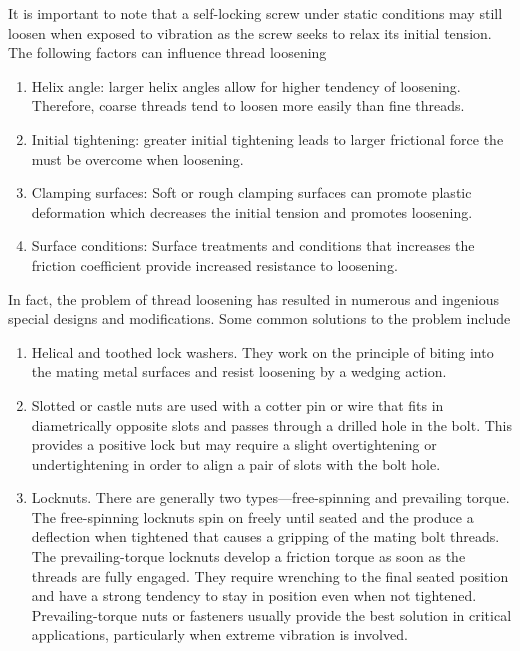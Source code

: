 \documentclass[a4paper,openany,nobib]{tufte-book}
\begin{document}
{{It is important to note that a self-locking screw under static
conditions may still loosen when exposed to vibration as the screw seeks
to relax its initial tension. The following factors can influence thread
loosening

\begin{enumerate}
\item Helix angle: larger helix angles allow for higher tendency of
loosening. Therefore, coarse threads tend to loosen more easily than
fine threads.

\item Initial tightening: greater initial tightening leads to larger
frictional force the must be overcome when loosening.

\item Clamping surfaces: Soft or rough clamping surfaces can promote
plastic deformation which decreases the initial tension and promotes
loosening.

\item Surface conditions: Surface treatments and conditions that increases
the friction coefficient provide increased resistance to loosening.
\end{enumerate}

In fact, the problem of thread loosening has resulted in numerous and
ingenious special designs and modifications. Some common solutions to
the problem include

\begin{enumerate}
\item Helical and toothed lock washers. They work on the principle of
biting into the mating metal surfaces and resist loosening by a
wedging action.

\item Slotted or castle nuts are used with a cotter pin or wire that fits
in diametrically opposite slots and passes through a drilled hole in
the bolt. This provides a positive lock but may require a slight
overtightening or undertightening in order to align a pair of slots
with the bolt hole.

\item Locknuts. There are generally two types---free-spinning and
prevailing torque. The free-spinning locknuts spin on freely until
seated and the produce a deflection when tightened that causes a
gripping of the mating bolt threads. The prevailing-torque locknuts
develop a friction torque as soon as the threads are fully engaged.
They require wrenching to the final seated position and have a strong
tendency to stay in position even when not tightened.
Prevailing-torque nuts or fasteners usually provide the best solution
in critical applications, particularly when extreme vibration is
involved.


\end{enumerate}}}
\end{document}
